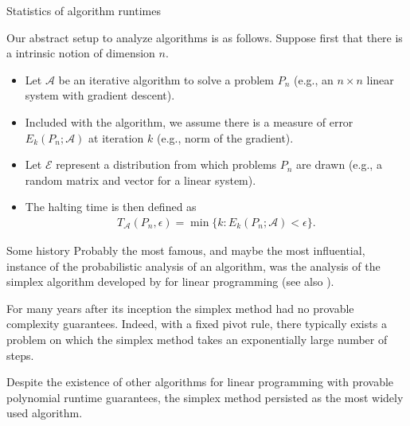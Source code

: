 \documentclass[9pt,aspectratio=169]{beamer}
\begin{document}
\begin{frame}{Statistics of algorithm runtimes}


Our abstract setup to analyze algorithms is as follows. Suppose first that there is a intrinsic notion of dimension $n$. \pause
\begin{itemize}
\item  Let $\mathcal A$ be an iterative algorithm to solve a problem $P_n$ (e.g., an $n\times n$ linear system with gradient descent). \pause
\item  Included with the algorithm, we assume there is a measure of error $E_k(P_n; \mathcal A)$ at iteration $k$ (e.g., norm of the gradient). \pause
\item  Let $\mathcal E$ represent a distribution from which problems $P_n$ are drawn (e.g., a random matrix and vector for a linear system). \pause
\item The halting time is then defined as 
\begin{align*}T_{\mathcal A}(P_n,\epsilon) = \min \{k : E_k(P_n; \mathcal A) < \epsilon\}. \end{align*}
\end{itemize}
\end{frame}

\begin{frame}{Some history}
Probably the most famous, and maybe the most influential, instance of the probabilistic analysis of an algorithm, was the analysis of the simplex algorithm developed by \cite{Dantzig1951} for linear programming (see also \cite{Dantzig1990}).

\vspace{.1in}\pause

For many years after its inception the simplex method had no provable complexity guarantees. Indeed, with a fixed pivot rule, there typically exists a problem on which the simplex method takes an exponentially large number of steps. 

\vspace{.1in}\pause

Despite the existence of other algorithms for linear programming with provable polynomial runtime guarantees, the simplex method persisted as the most widely used algorithm.
\end{frame}
\end{document}
